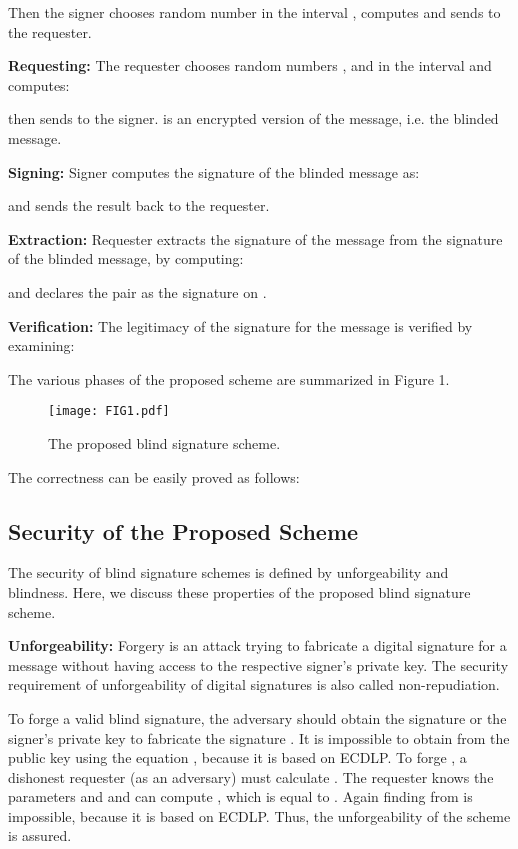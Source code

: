 \documentclass[journal,onecolumn,draftcls]{IEEEtran}
\newcommand{\figwidth}{\columnwidth}\newcommand{\binom}[2]{\genfrac{(}{)}{0pt}{}{#1}{#2}}
\begin{document}
Then the signer chooses random number  in the interval , computes  and sends  to the requester.

\textbf{Requesting:} The requester chooses random numbers ,  and  in the interval  and computes:

then sends  to the signer.  is an encrypted version of the message, i.e. the blinded message.

\textbf{Signing:} Signer computes the signature of the blinded message as:

and sends the result back to the requester.

\textbf{Extraction:} Requester extracts the signature of the message from the signature of the blinded message, by computing:

and declares the pair  as the signature on .

\textbf{Verification:} The legitimacy of the signature  for the message  is verified by examining:

The various phases of the proposed scheme are summarized in Figure 1. 

\begin{figure}[t]\centering
\texttt{[image: FIG1.pdf]}\caption{The proposed blind signature scheme.}\label{fig:scheme}\end{figure}

The correctness can be easily proved as follows:



\subsection{Security of the Proposed Scheme}
The security of blind signature schemes is defined by unforgeability and blindness. Here, we discuss these properties of the proposed blind signature scheme.

\textbf{Unforgeability:} Forgery is an attack trying to fabricate a digital signature for a message without having access to the respective signer's private key. The security requirement of unforgeability of digital signatures is also called non-repudiation.

To forge a valid blind signature, the adversary should obtain the signature  or the signer's private key  to fabricate the signature . It is impossible to obtain  from the public key  using the equation , because it is based on ECDLP. To forge , a dishonest requester (as an adversary) must calculate . The requester knows the parameters  and  and can compute , which is equal to . Again finding  from  is impossible, because it is based on ECDLP. Thus, the unforgeability of the scheme is assured.
\end{document}
